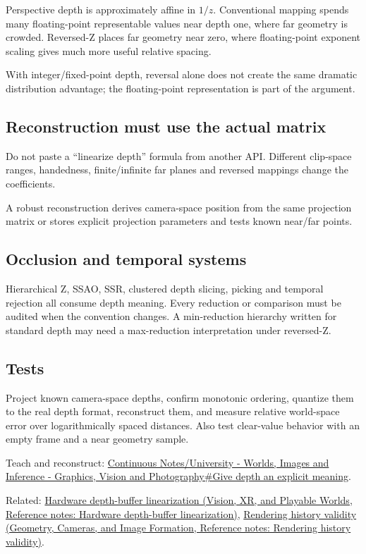 Perspective depth is approximately affine in \(1/z\). Conventional mapping spends many floating-point representable values near depth one, where far geometry is crowded. Reversed-Z places far geometry near zero, where floating-point exponent scaling gives much more useful relative spacing.

With integer/fixed-point depth, reversal alone does not create the same dramatic distribution advantage; the floating-point representation is part of the argument.

\subsection{Reconstruction must use the actual matrix}\label{appendix-275ec8847057-reconstruction-must-use-the-actual-matrix}

Do not paste a ``linearize depth'' formula from another API. Different clip-space ranges, handedness, finite/infinite far planes and reversed mappings change the coefficients.

A robust reconstruction derives camera-space position from the same projection matrix or stores explicit projection parameters and tests known near/far points.

\subsection{Occlusion and temporal systems}\label{appendix-275ec8847057-occlusion-and-temporal-systems}

Hierarchical Z, SSAO, SSR, clustered depth slicing, picking and temporal rejection all consume depth meaning. Every reduction or comparison must be audited when the convention changes. A min-reduction hierarchy written for standard depth may need a max-reduction interpretation under reversed-Z.

\subsection{Tests}\label{appendix-275ec8847057-tests}

Project known camera-space depths, confirm monotonic ordering, quantize them to the real depth format, reconstruct them, and measure relative world-space error over logarithmically spaced distances. Also test clear-value behavior with an empty frame and a near geometry sample.

Teach and reconstruct: \hyperref[03-visual-computing-i-ch012-give-depth-an-explicit-meaning]{Continuous Notes/University - Worlds, Images and Inference - Graphics, Vision and Photography\#Give depth an explicit meaning}.

Related: \href{../07-Vision-XR-and-Playable-Worlds/main.pdf\#nameddest=appendix-1bc40b08db4a}{Hardware depth-buffer linearization (Vision, XR, and Playable Worlds, Reference notes: Hardware depth-buffer linearization)}, \href{../03-Geometry-Cameras-and-Image-Formation/main.pdf\#nameddest=appendix-2e7e9fd28a2c}{Rendering history validity (Geometry, Cameras, and Image Formation, Reference notes: Rendering history validity)}.
